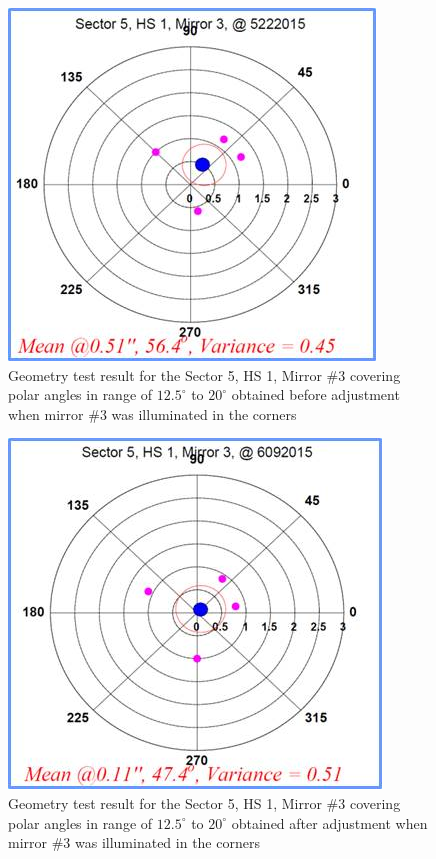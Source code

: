 \begin{figure}[h]
    \centering
    \includegraphics[width=1.0\linewidth,trim={0 0cm 0 0},clip]{images/Ch_5_1_3_Before.jpg}
    \caption{Geometry test result for the Sector 5, HS 1, Mirror \#3 covering polar angles in range of $12.5^\circ$ to $20^\circ$ obtained before adjustment when mirror \#3 was illuminated in the corners}
    \label{fig:Ch_5_1_3_Before}
\end{figure}

\begin{figure}[h]
    \centering
    \includegraphics[width=1.0\linewidth,trim={0 0cm 0 0},clip]{images/Ch_5_1_3_After.jpg}
    \caption{Geometry test result for the Sector 5, HS 1, Mirror \#3 covering polar angles in range of $12.5^\circ$ to $20^\circ$ obtained after adjustment when mirror \#3 was illuminated in the corners}
    \label{fig:Ch_5_1_3_After}
\end{figure}

